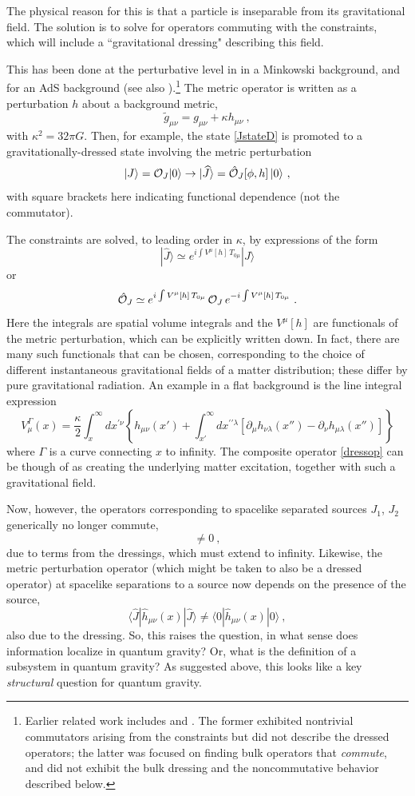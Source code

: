 \documentclass[12pt]{article}
\numberwithin{equation}{section}
\newcommand{\beq}{\begin{equation}}
\newcommand{\eeq}{\end{equation}}
\begin{document}
The physical reason for this is that a particle is inseparable from its gravitational field.  The solution is to solve for operators commuting with the constraints, which will include a ``gravitational dressing" describing this field.

This has been done at the perturbative level in \cite{DoGi1,DoGi4} in a Minkowski background, and \cite{GiKi} for an AdS background (see also \cite{CGPR}).\footnote{Earlier related work includes \cite{Heem} and  \cite{KaLigrav}.   The former exhibited nontrivial commutators arising from the constraints but did not describe the dressed operators; the latter was focused on finding bulk operators that {\it commute}, and did not exhibit  the bulk dressing and the noncommutative behavior described below.}  The metric operator is written as a perturbation $h$ about a background metric,
\beq
\tilde g_{\mu\nu} = g_{\mu\nu} + \kappa h_{\mu\nu}\ ,
\eeq
with $\kappa^2=32\pi G$.  Then, for example, the state \eqref{JstateD} is promoted to a gravitationally-dressed state involving the metric perturbation
\beq
|J\rangle= {\cal O}_J|0\rangle\rightarrow |\widehat J\rangle =\hat{\cal O}_J[\phi,h]\,|0\rangle\ ,
\eeq
with square brackets  here indicating functional dependence (not the commutator).

The constraints are solved, to leading order in $\kappa$, by expressions of the form
\beq
|\widehat J\rangle \simeq e^{i\int V^\mu[h]\,T_{0\mu}} |J\rangle
\eeq
or
\beq\label{dressop}
\hat {\cal O}_J \simeq e^{i\int V^\mu[h]\,T_{0\mu}}\, {\cal O}_J\, e^{-i\int V^\mu[h]\,T_{0\mu}}\ .
\eeq
Here the integrals are spatial volume integrals and
the  $V^\mu[h]$ are functionals of the metric perturbation, which can be explicitly written down.  In fact, there are many such functionals that can be chosen, corresponding to the choice of different instantaneous gravitational fields of a matter distribution; these differ by pure gravitational radiation.  An example in a flat background is the line integral expression \cite{DoGi1,QGQF}
\beq
 V_\mu^\Gamma(x)= \frac{\kappa}{2} \int_x^\infty dx^{\prime\nu} \left\{ h_{\mu\nu}(x') + \int_{x'}^\infty dx^{\prime\prime\lambda}\left[\partial_\mu h_{\nu\lambda}(x'') - \partial_\nu h_{\mu\lambda}(x'')\right]\right\}
\eeq
where $\Gamma$ is a curve connecting $x$ to infinity.
The composite operator \eqref{dressop} can be though of as creating the underlying matter excitation, together with such a gravitational field.

Now, however, the operators corresponding to spacelike separated sources $J_1$, $J_2$ generically no longer commute\cite{SGalg,DoGi1},
\beq
[\hat{\cal O}_{J_1}\,,\hat{\cal O}_{J_2}]\neq0\ ,
\eeq
due to terms from the dressings, which must extend to infinity\cite{DoGi2}.  Likewise, the metric perturbation operator (which might be taken to also be a dressed operator) at spacelike separations to a source   now depends on the presence of the source,
\beq
\langle\widehat J|\hat h_{\mu\nu}(x)|\widehat J\rangle \neq\langle 0|\hat h_{\mu\nu}(x)|0\rangle\ ,
\eeq
also due to the dressing.  So, this raises the question, in what sense does information localize in quantum gravity?  Or, what is the definition of a subsystem in quantum gravity?  As suggested above, this looks like a key {\it structural} question for quantum gravity.
\end{document}
